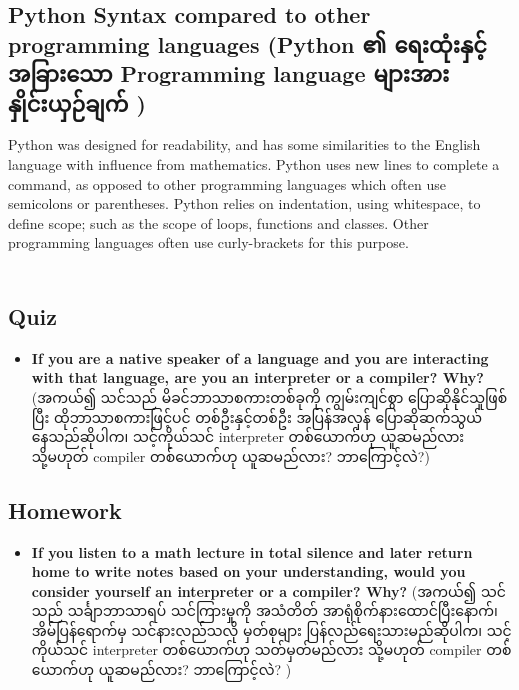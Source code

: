 \documentclass{report}
\begin{document}
\subsection{Python Syntax compared to other programming languages ({\burmesefont Python ၏ ရေးထုံးနှင့် အခြားသော Programming language များအား နှိုင်းယှဉ်ချက် })}

Python was designed for readability, and has some similarities to the English language with influence from mathematics. Python uses new lines to complete a command, as opposed to other programming languages which often use semicolons or parentheses. Python relies on indentation, using whitespace, to define scope; such as the scope of loops, functions and classes. Other programming languages often use curly-brackets for this purpose.
\\\\

\subsection*{Quiz}
\begin{itemize}
    \item \textbf{If you are a native speaker of a language and you are interacting with that language, are you an interpreter or a compiler? Why?} ({\burmesefont အကယ်၍ သင်သည် မိခင်ဘာသာစကားတစ်ခုကို ကျွမ်းကျင်စွာ ပြောဆိုနိုင်သူဖြစ်ပြီး ထိုဘာသာစကားဖြင့်ပင် တစ်ဦးနှင့်တစ်ဦး အပြန်အလှန် ပြောဆိုဆက်သွယ်နေသည်ဆိုပါက၊ သင့်ကိုယ်သင် interpreter တစ်ယောက်ဟု ယူဆမည်လား သို့မဟုတ် compiler တစ်ယောက်ဟု ယူဆမည်လား? ဘာကြောင့်လဲ?})
    
\end{itemize}

\subsection*{Homework}
\begin{itemize}
    \item \textbf{If you listen to a math lecture in total silence and later return home to write notes based on your understanding, would you consider yourself an interpreter or a compiler? Why?} ({\burmesefont အကယ်၍ သင်သည် သင်္ချာဘာသာရပ် သင်ကြားမှုကို အသံတိတ် အာရုံစိုက်နားထောင်ပြီးနောက်၊ အိမ်ပြန်ရောက်မှ သင်နားလည်သလို မှတ်စုများ ပြန်လည်ရေးသားမည်ဆိုပါက၊ သင့်ကိုယ်သင် interpreter တစ်ယောက်ဟု သတ်မှတ်မည်လား သို့မဟုတ် compiler တစ်ယောက်ဟု ယူဆမည်လား? ဘာကြောင့်လဲ?
})
\end{itemize}
\end{document}
